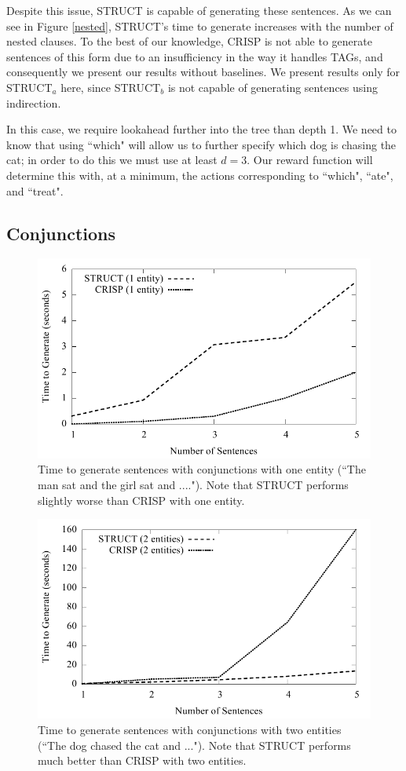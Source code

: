Despite this issue, STRUCT is capable of generating these sentences.  As we can
see in Figure \ref{nested}, STRUCT's time to generate increases with the number of
nested clauses.  To the best of our knowledge, CRISP is not able to generate sentences
of this form due to an insufficiency in the way it handles TAGs,
and consequently we present our results without baselines.  We present
results only for STRUCT$_a$ here, since STRUCT$_b$ is not capable of generating
sentences using indirection.

In this case, we require lookahead further into the tree than depth 1.  We need to know
that using ``which" will allow us to further specify which dog is chasing the cat;
in order to do this we must use at least $d=3$.  Our reward function will determine this
with, at a minimum, the actions corresponding to ``which", ``ate", and ``treat".

\subsection{Conjunctions}

\begin{figure}
\centering
\includegraphics[width=0.7 \linewidth]{../analysis/struct/conjunction/conjunction1.pdf}
\caption{Time to generate sentences with conjunctions with one entity (``The man sat and the girl sat and ....").
Note that STRUCT performs slightly worse than CRISP with one entity.}
\label{graph-conjunction1}
\end{figure}

\begin{figure}
\centering
\includegraphics[width=0.7 \linewidth]{../analysis/struct/conjunction/conjunction2.pdf}
\caption{Time to generate sentences with conjunctions with two entities (``The dog chased the cat and ...").  Note that
STRUCT performs much better than CRISP with two entities.}
\label{graph-conjunction2}
\end{figure}

